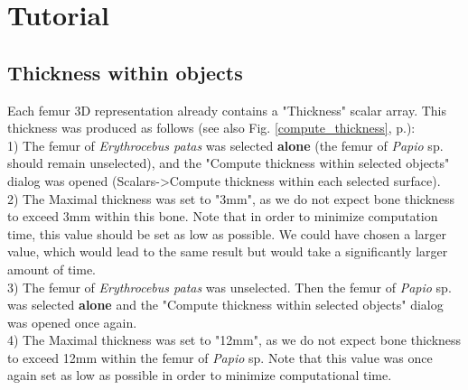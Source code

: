 \documentclass[12pt, a4paper]{book}
\begin{document}
\section{Tutorial}

\subsection{Thickness within objects}
Each femur 3D representation already contains a "Thickness" scalar array. This thickness was produced as follows (see also Fig. \ref{compute_thickness}, p.\pageref{compute_thickness}): \\
1) The femur of \textit{Erythrocebus patas} was selected \textbf{alone} (the femur of \textit{Papio} sp. should remain unselected), and the "Compute thickness within selected objects" dialog was opened (Scalars->Compute thickness within each selected surface). \\
2) The Maximal thickness was set to "3mm", as we do not expect bone thickness to exceed 3mm within this bone. Note that in order to minimize computation time, this value should be set as low as possible. We could have chosen a larger value, which would lead to the same result but would take a significantly larger amount of time.\\
3) The femur of \textit{Erythrocebus patas} was unselected. Then the femur of \textit{Papio} sp. was selected \textbf{alone} and the "Compute thickness within selected objects" dialog was opened once again. \\
4) The Maximal thickness was set to "12mm", as we do not expect bone thickness to exceed 12mm within the femur of \textit{Papio} sp. Note that this value was once again set as low as possible in order to minimize computational time.\\
\end{document}

